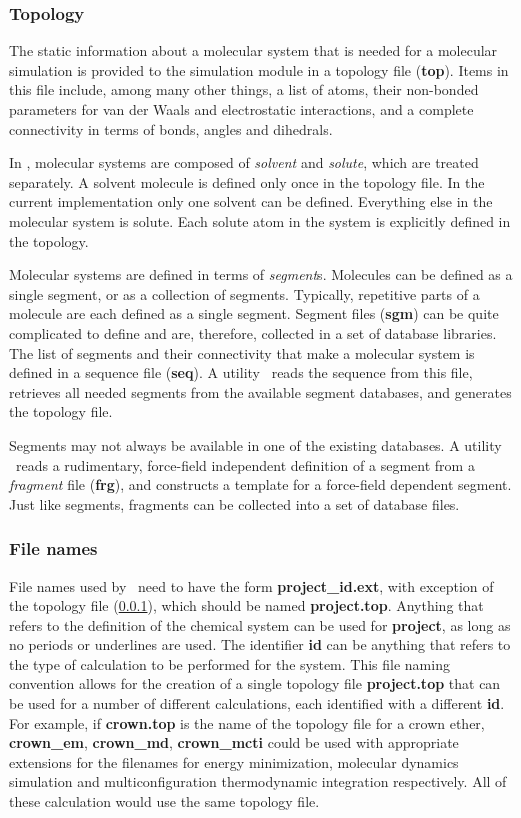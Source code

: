 \subsubsection{Topology}
\label{topology}
The static information about a molecular system that is needed for
a molecular simulation is provided to the simulation module in a
topology file ({\bf top}). 
Items in this file include, among many other things, 
a list of atoms, their non-bonded parameters for van der Waals and
electrostatic interactions, and a complete connectivity in terms
of bonds, angles and dihedrals.
\par
In \nwargos, molecular systems are composed of {\it solvent} and 
{\it solute}, which are treated separately. A solvent molecule is 
defined only once in the topology file. In the
current implementation only one solvent can be defined. Everything
else in the molecular system is solute. Each solute atom in the
system is explicitly defined in the topology. 
\par
Molecular systems are defined in terms of {\it segment}s. Molecules
can be defined as a single segment, or as a collection of segments.
Typically, repetitive parts of a molecule are each defined as a single
segment. Segment files ({\bf sgm}) can be quite complicated to define 
and are, therefore, collected in a set of database libraries. 
The list of segments and their connectivity that make a molecular system 
is defined in a sequence file ({\bf seq}). 
A utility \nwtop\ reads the sequence from this file, retrieves all 
needed segments from the available segment databases, and generates the
topology file.
\par
Segments may not always be available in one of the existing databases.
A utility \nwsgm\ reads a rudimentary, force-field independent
definition of a segment from a {\it fragment} file ({\bf frg}), and 
constructs a template for a force-field dependent segment. 
Just like segments, fragments can be collected into a set of database files.
\subsubsection{File names}
\label{filenames}
\par
File names used by \nwargos\  need to have the form
{\bf project\_id.ext}, with exception of the
topology file (\ref{topology}), which should be named {\bf project.top}.
Anything that refers to the definition of the chemical system can be used
for {\bf project}, as long as no periods or underlines are used.
The identifier {\bf id} can be anything that refers to the type of 
calculation to be performed for the system.
This file naming convention allows for the creation of a single topology file
{\bf project.top} that can be used for a number of 
different calculations, each identified with a different {\bf id}.
For example, if {\bf crown.top} is the name of the topology file for
a crown ether, {\bf crown\_em}, {\bf crown\_md}, {\bf crown\_mcti} could
be used with appropriate extensions for the filenames for energy
minimization, molecular dynamics simulation and multiconfiguration
thermodynamic integration respectively. All of these calculation
would use the same topology file.
